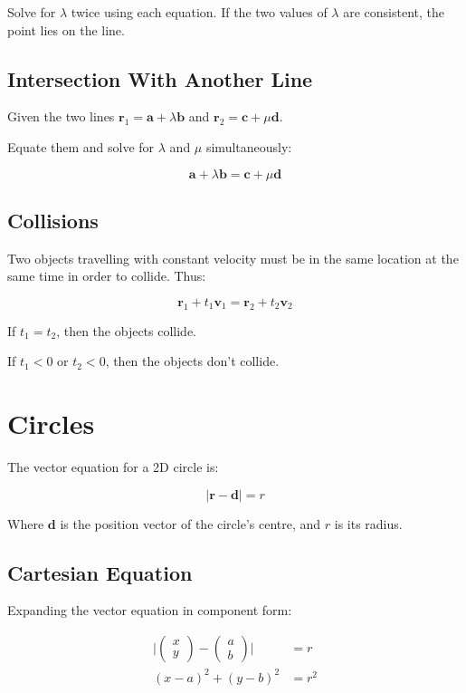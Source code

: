 \documentclass[a4paper,11pt]{article}
\newcommand{\bb}{\boldsymbol}
\begin{document}
Solve for $\lambda$ twice using each equation. If the two values of $\lambda$
are consistent, the point lies on the line.


\subsection{Intersection With Another Line}

Given the two lines $\bb{r}_1 = \bb{a} + \lambda \bb{b}$ and
$\bb{r}_2 = \bb{c} + \mu \bb{d}$.

Equate them and solve for $\lambda$ and $\mu$ simultaneously:

$$
\bb{a} + \lambda \bb{b} = \bb{c} + \mu \bb{d}
$$


\subsection{Collisions}

Two objects travelling with constant velocity must be in the same location at
the same time in order to collide. Thus:

$$
\bb{r}_1 + t_1 \bb{v}_1 = \bb{r}_2 + t_2 \bb{v}_2
$$

If $t_1 = t_2$, then the objects collide.

If $t_1 < 0$ or $t_2 < 0$, then the objects don't collide.



\section{Circles}

The vector equation for a 2D circle is:

$$
\lvert \bb{r} - \bb{d} \rvert = r
$$

Where $\bb{d}$ is the position vector of the circle's centre, and $r$ is its
radius.


\subsection{Cartesian Equation}

Expanding the vector equation in component form:

$$
\begin{aligned}
	\lvert \begin{pmatrix} x\\ y \end{pmatrix} - \begin{pmatrix} a\\ b \end{pmatrix} \rvert & = r \\
	(x - a)^2 + (y - b)^2 & = r^2 \\
\end{aligned}
$$
\end{document}
